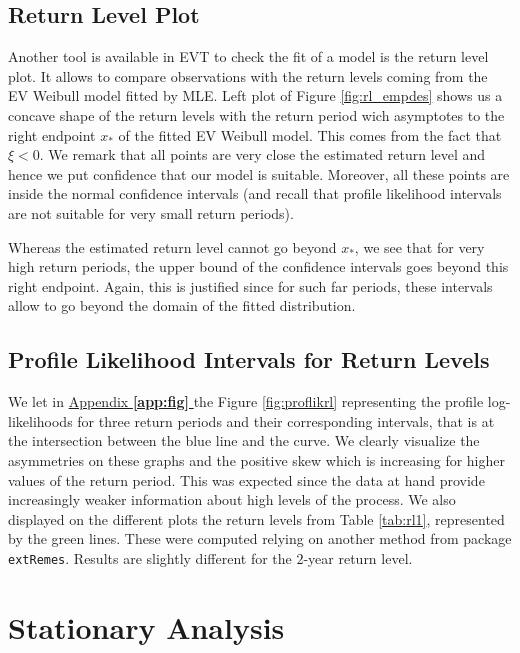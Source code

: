 \subsection*{Return Level Plot}

Another tool is available in EVT to check the fit of a model is the return level plot. It allows to compare
observations with the return levels coming from the EV Weibull model fitted by MLE. Left plot of
Figure \ref{fig:rl_empdes} shows us a concave shape of the return levels with the return period wich asymptotes to the right endpoint $x_*$ of the fitted EV Weibull model. This comes from the fact that $\xi<0$. We remark
that all points are very close the estimated return level and hence we put confidence that our model
is suitable. Moreover, all these points are inside the normal confidence intervals (and recall that profile
likelihood intervals are not suitable for very small return periods).

Whereas the estimated return level cannot go beyond $x_*$, we see that for very high return periods, the upper bound of the confidence intervals goes beyond this right endpoint. Again, this is justified since for such far periods, these intervals allow to go beyond the domain of the fitted distribution.



\subsection*{Profile Likelihood Intervals for Return Levels}

We let in \hyperref[app:fig]{Appendix \textbf{\ref{app:fig} }} the Figure \ref{fig:proflikrl} representing the profile log-likelihoods for three return periods and their corresponding intervals, that is at the intersection between the blue line and the curve. We
clearly visualize the asymmetries on these graphs and the positive skew which is increasing for higher
values of the return period. This was expected since the data at hand provide increasingly weaker
information about high levels of the process. We also displayed on the different plots the return levels
from Table \ref{tab:rl1}, represented by the green lines. These were computed relying on another method from
package \texttt{extRemes}. Results are slightly different for the $2$-year return level.


\section{Stationary Analysis}

